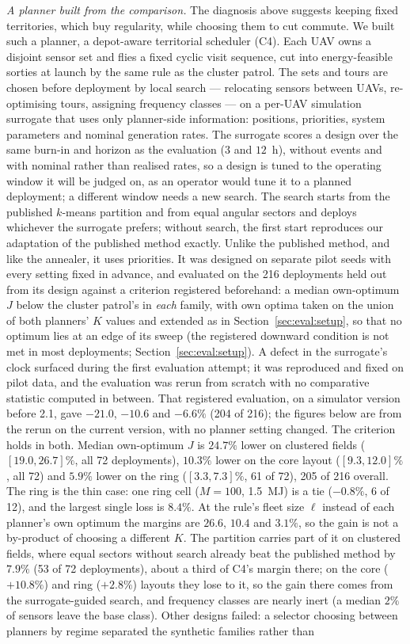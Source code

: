 \documentclass[journal,outdir=./]{IEEEtran}
\begin{document}
\textit{A planner built from the comparison.} The diagnosis above suggests keeping fixed territories, which buy regularity, while choosing them to cut commute. We built such a planner, a depot-aware territorial scheduler (C4). Each UAV owns a disjoint sensor set and flies a fixed cyclic visit sequence, cut into energy-feasible sorties at launch by the same rule as the cluster patrol. The sets and tours are chosen before deployment by local search --- relocating sensors between UAVs, re-optimising tours, assigning frequency classes --- on a per-UAV simulation surrogate that uses only planner-side information: positions, priorities, system parameters and nominal generation rates. The surrogate scores a design over the same burn-in and horizon as the evaluation ($3$ and $12$~h), without events and with nominal rather than realised rates, so a design is tuned to the operating window it will be judged on, as an operator would tune it to a planned deployment; a different window needs a new search. The search starts from the published $k$-means partition and from equal angular sectors and deploys whichever the surrogate prefers; without search, the first start reproduces our adaptation of the published method exactly. Unlike the published method, and like the annealer, it uses priorities. It was designed on separate pilot seeds with every setting fixed in advance, and evaluated on the 216 deployments held out from its design against a criterion registered beforehand: a median own-optimum $J$ below the cluster patrol's in \emph{each} family, with own optima taken on the union of both planners' $K$ values and extended as in Section~\ref{sec:eval:setup}, so that no optimum lies at an edge of its sweep (the registered downward condition is not met in most deployments; Section~\ref{sec:eval:setup}). A defect in the surrogate's clock surfaced during the first evaluation attempt; it was reproduced and fixed on pilot data, and the evaluation was rerun from scratch with no comparative statistic computed in between. That registered evaluation, on a simulator version before 2.1, gave $-21.0$, $-10.6$ and $-6.6\%$ (204 of 216); the figures below are from the rerun on the current version, with no planner setting changed. The criterion holds in both. Median own-optimum $J$ is $24.7\%$ lower on clustered fields ($[19.0,26.7]\%$, all 72 deployments), $10.3\%$ lower on the core layout ($[9.3,12.0]\%$, all 72) and $5.9\%$ lower on the ring ($[3.3,7.3]\%$, 61 of 72), 205 of 216 overall. The ring is the thin case: one ring cell ($M=100$, 1.5~MJ) is a tie ($-0.8\%$, 6 of 12), and the largest single loss is $8.4\%$. At the rule's fleet size $\ell$ instead of each planner's own optimum the margins are $26.6$, $10.4$ and $3.1\%$, so the gain is not a by-product of choosing a different $K$. The partition carries part of it on clustered fields, where equal sectors without search already beat the published method by $7.9\%$ (53 of 72 deployments), about a third of C4's margin there; on the core ($+10.8\%$) and ring ($+2.8\%$) layouts they lose to it, so the gain there comes from the surrogate-guided search, and frequency classes are nearly inert (a median $2\%$ of sensors leave the base class). Other designs failed: a selector choosing between planners by regime separated the synthetic families rather than 
\end{document}
